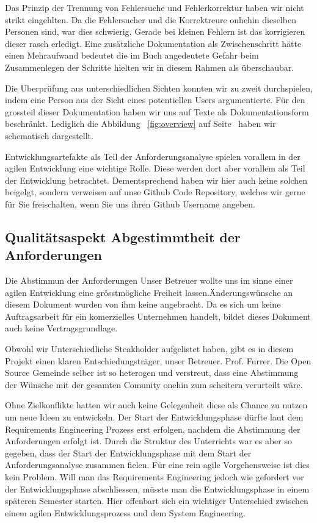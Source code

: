 \documentclass[11pt,titelpage]{scrartcl}
\begin{document}
Das Prinzip der Trennung von Fehlersuche und Fehlerkorrektur haben wir nicht strikt eingehlten. Da die Fehlersucher und die Korrektreure onhehin dieselben Personen sind, war dies schwierig. Gerade bei kleinen Fehlern ist das korrigieren dieser rasch erledigt. Eine zusätzliche Dokumentation als Zwischenschritt hätte einen Mehraufwand bedeutet die im Buch angedeutete Gefahr beim Zusammenlegen der Schritte hielten wir in diesem Rahmen als überschaubar.

Die Uberprüfung aus unterschiedlichen Sichten konnten wir zu zweit durchspielen, indem eine Person aus der Sicht eines potentiellen Users argumentierte.
Für den grossteil dieser Dokumentation haben wir uns auf Texte als Dokumentationsform beschränkt. Lediglich die Abbildung ~\ref{fig:overview} auf Seite~\pageref{fig:overview} haben wir schematisch dargestellt.

Entwicklungsartefakte als Teil der Anforderungsanalyse spielen vorallem in der agilen Entwicklung eine wichtige Rolle. Diese werden dort aber vorallem als Teil der Entwicklung  betrachtet. Dementsprechend haben wir hier auch keine solchen beigelgt, sondern verweisen auf unse Github Code Repository, welches wir gerne für Sie freischalten, wenn Sie uns ihren Github Username angeben.


\subsection{Qualitätsaspekt Abgestimmtheit der Anforderungen}
Die Abstimmun der Anforderungen
Unser Betreuer wollte uns im sinne einer agilen Entwicklung eine grösstmögliche Freiheit lassen.Änderungswünsche an diesem Dokument wurden von ihm keine angebracht. Da es sich um keine Auftragsarbeit für ein komerzielles Unternehmen handelt, bildet dieses Dokument auch keine Vertragsgrundlage.

Obwohl wir Unterschiedliche Steakholder aufgelistet haben, gibt es in diesem Projekt einen klaren Entschiedungsträger, unser Betreuer. Prof. Furrer. Die Open Source Gemeinde selber ist so heterogen und verstreut, dass  eine Abstimmung der Wünsche mit der gesamten Comunity onehin zum scheitern verurteilt wäre.

Ohne Zielkonflikte hatten wir auch keine Gelegenheit diese als Chance zu nutzen um neue Ideen zu entwickeln. Der Start der Entwicklungsphase dürfte laut dem Requirements Engineering Prozess erst erfolgen, nachdem die Abstimmung der Anforderungen erfolgt ist.
Durch die Struktur des Unterrichts war es aber so gegeben, dass der Start der Entwicklungsphase  mit dem Start der Anforderungsanalyse zusammen fielen. Für eine rein agile Vorgehensweise ist dies kein Problem. Will man das Requirements Engineering jedoch wie gefordert vor der Entwicklungsphase abschliessen, müsste man die Entwicklungsphase in einem späteren Semester starten.
Hier offenbart sich ein wichtiger Unterschied zwischen  einem agilen Entwicklungsprozess und dem System Engineering.
\end{document}
